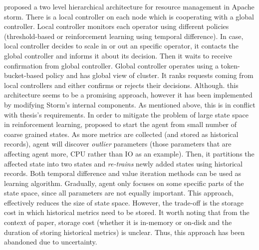 \textcite{CARDELLINI2018171} proposed a two level hierarchical architecture for resource management in Apache storm\cite{Storm}. There is a local controller on each node which is cooperating with a global controller. Local controller monitors each operator using different policies (threshold-based or reinforcement learning using temporal difference). In case, local controller decides to scale in or out an specific operator, it contacts the global controller and informs it about its decision. Then it waits to receive confirmation from global controller. Global controller operates using a token-bucket-based policy\cite{Valeria:2018} and has global view of cluster. It ranks requests coming from local controllers and either confirms or rejects their decisions. Although. this architecture seems to be a promising approach, however it has been implemented by modifying Storm's internal components. As mentioned above, this is in conflict with thesis's requirements.
\newpage
In order to mitigate the problem of large state space in reinforcement learning, \textcite{Lolos:2017} proposed to start the agent from small number of coarse grained states. As more metrics are collected (and stored as historical records), agent will discover \emph{outlier} parameters (those parameters that are affecting agent more, CPU rather than IO as an example). Then, it partitions the affected state into two states and \emph{re-trains} newly added states using historical records. Both temporal difference and value iteration methods can be used as learning algorithm. Gradually, agent only focuses on some specific parts of the state space, since all parameters are not equally important. This approach, effectively reduces the size of state space. However, the trade-off is the storage cost in which historical metrics need to be stored. It worth noting that from the context of paper, storage cost (whether it is in-memory or on-disk and the duration of storing historical metrics) is unclear. Thus, this approach has been abandoned due to uncertainty.\newline

